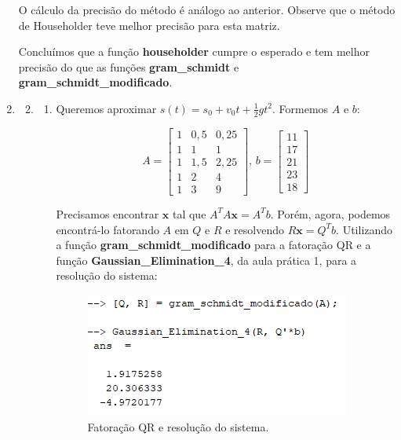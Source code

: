 \documentclass[11pt]{article}
\begin{document}
\begin{enumerate}
            O cálculo da precisão do método é análogo ao anterior. Observe que o método de Householder teve melhor precisão para esta matriz.
            
            Concluímos que a função \textbf{householder} cumpre o esperado e tem melhor precisão do que as funções \textbf{gram\_schmidt} e \textbf{gram\_schmidt\_modificado}.
        
        \bigbreak
        
        \item %
        
            \begin{enumerate}[label=\arabic*)]
                \setcounter{enumii}{1}
                \item %
                
                \begin{enumerate}[label=\alph*)]
                    \item Queremos aproximar $s(t) = s_0 + v_0t + \frac{1}{2}gt^2$. Formemos $A$ e $b$:
                
                    $$A = \begin{bmatrix}
                    1& 0,5& 0,25\\
                    1& 1& 1\\
                    1& 1,5& 2,25\\
                    1& 2& 4\\
                    1& 3& 9
                    \end{bmatrix}\textrm{, }
                    b = \begin{bmatrix}
                    11\\
                    17\\
                    21\\
                    23\\
                    18
                    \end{bmatrix}$$
                    
                    Precisamos encontrar $\mathbf{x}$ tal que $A^TA\mathbf{x}=A^Tb$. Porém, agora, podemos encontrá-lo fatorando $A$ em $Q$ e $R$ e resolvendo $R\mathbf{x} = Q^Tb$. Utilizando a função \textbf{gram\_schmidt\_modificado} para a fatoração QR e a função \textbf{Gaussian\_Elimination\_4}, da aula prática 1, para a resolução do sistema:
        
                    \begin{figure}[H]
                        \centering
                        \includegraphics[]{4-1}
                        \caption{Fatoração QR e resolução do sistema.}
                    \end{figure}
                    

\end{enumerate}
\end{enumerate}
\end{enumerate}
\end{document}
